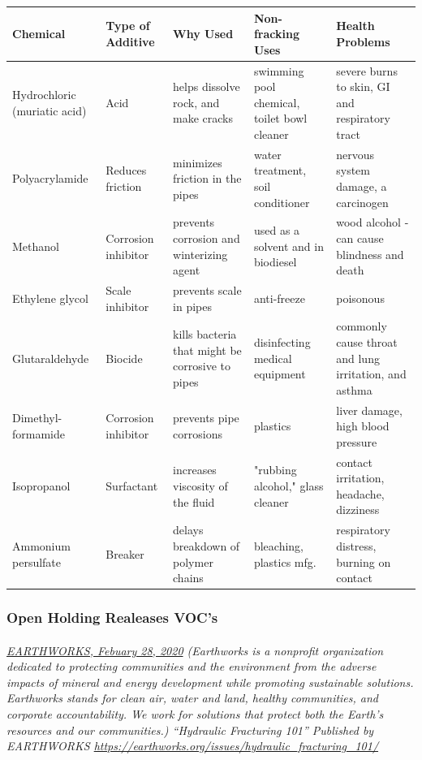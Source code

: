 \documentclass{article}
\begin{document}
\begin{table}
  \begin{center}
    \begin{tabular}{p{2.5cm} | p{1.7cm} | p{3cm} | p{3.5cm} | p{4.2cm}}  %
      \textbf{Chemical} & \textbf{Type of Additive} & \textbf{Why Used}& \textbf{Non-fracking Uses}& \textbf{Health Problems}\\

      \midrule
      Hydrochloric (muriatic acid) & Acid & helps dissolve rock, and make cracks & swimming pool chemical, toilet bowl cleaner & severe burns to skin, GI and respiratory tract\\
      \midrule
      Polyacrylamide & Reduces friction & minimizes friction in the pipes & water treatment, soil conditioner & nervous system damage, a carcinogen\\
      \midrule
      Methanol&Corrosion inhibitor&prevents corrosion and winterizing agent&used as a solvent and in biodiesel&wood alcohol - can cause blindness and death\\
      \midrule
      Ethylene glycol&Scale inhibitor&prevents scale in pipes&anti-freeze&poisonous\\
      \midrule
      Glutaraldehyde&Biocide&kills bacteria that might be corrosive to pipes&disinfecting medical equipment&commonly cause throat and lung irritation, and asthma\\
      \midrule
      Dimethyl-formamide&Corrosion inhibitor&prevents pipe corrosions&plastics&liver damage, high blood pressure\\
      \midrule
      Isopropanol&Surfactant&increases viscosity of the fluid&"rubbing alcohol," glass cleaner&contact irritation, headache, dizziness\\
      \midrule
      Ammonium persulfate&Breaker&delays breakdown of polymer chains&bleaching, plastics mfg.&respiratory distress, burning on contact

    \end{tabular}
  \end{center}
\end{table}

\subsubsection{Open Holding Realeases VOC's}
\paragraph{}
\small
\textit{
\underline{EARTHWORKS, Febuary 28, 2020}
(Earthworks is a nonprofit organization dedicated to protecting communities and the environment from the adverse impacts of mineral and energy development while promoting sustainable solutions. Earthworks stands for clean air, water and land, healthy communities, and corporate accountability. We work for solutions that protect both the Earth’s resources and our communities.) “Hydraulic Fracturing 101” Published by EARTHWORKS 
\url{https://earthworks.org/issues/hydraulic_fracturing_101/}}
\normalsize
\end{document}
